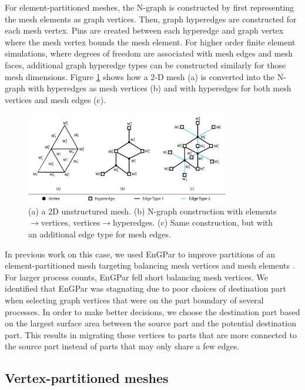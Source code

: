 \documentclass[conference]{IEEEtran}
\begin{document}
For element-partitioned meshes, the N-graph is constructed by first representing the mesh elements
as graph vertices. Then, graph hyperedges are constructed for each mesh vertex. Pins
are created between each hyperedge and graph vertex where the mesh vertex bounds the
mesh element. For higher order finite element simulations, where degrees of freedom are
associated with mesh edges and mesh faces, additional graph hyperedge types can be constructed
similarly for those mesh dimensions. Figure \ref{fig:mesh2graph} shows how a 2-D mesh (a)
is converted into the N-graph with hyperedges as mesh vertices (b) and with hyperedges for
both mesh vertices and mesh edges (c).

\begin{figure}[!ht]
  \centering
  \includegraphics[width=3.5in]{../figures/exampleMesh2Graph.png}
  \caption{(a) a 2D unstructured mesh. (b) N-graph construction with elements$\rightarrow$vertices, vertices$\rightarrow$hyperedges. (c) Same construction, but with an additional edge type for mesh edges.}
  \label{fig:mesh2graph}
\end{figure}

In previous work on this case, we used EnGPar to improve partitions of an
element-partitioned mesh targeting balancing mesh vertices and mesh elements \cite{engparSC17}.
For larger process counts, EnGPar fell short balancing mesh vertices.
We identified that EnGPar was stagnating due to poor choices of destination part
when selecting graph vertices that were on the part boundary of several processes. In order
to make better decisions, we choose the destination part based on the largest surface area
between the source part and the potential destination part. This results in migrating these
vertices to parts that are more connected to the source part instead of parts that may only
share a few edges.

\subsection{Vertex-partitioned meshes}\label{sec:vtxPtn}
\end{document}
